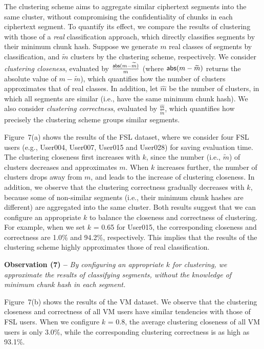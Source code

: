 \documentclass[bachelor]{thesis-uestc}
\begin{document}
The clustering scheme aims to aggregate similar ciphertext segments into the
same cluster, without compromising the confidentiality of chunks in each
ciphertext segment.  To quantify its effect, we compare the results of
clustering with those of a {\em real} classification approach, which directly
classifies segments by their minimum chunk hash.  Suppose we generate $m$ real
classes of segments by classification, and $\widetilde{m}$ clusters by the
clustering scheme, respectively.  We consider {\em clustering closeness},
evaluated by $\frac{{\sf abs}(m-\widetilde{m})}{m}$ (where 
${\sf abs}(m-\widetilde{m})$ returns the absolute value of $m-\widetilde{m}$),
which quantifies how the  number of clusters approximates that of real
classes. In addition, let $\hat{m}$ be the number of clusters, in which all
segments are similar (i.e., have the same minimum chunk hash). We also
consider {\em clustering correctness}, evaluated by
$\frac{\hat{m}}{\widetilde{m}}$, which quantifies how precisely the clustering
scheme groups similar segments.  

Figure~7(a) shows the results of the FSL dataset, where we
consider four FSL users (e.g., User004, User007, User015 and User028) for
saving evaluation time. The clustering closeness first increases with $k$,
since the number (i.e., $\widetilde{m}$) of clusters decreases and
approximates $m$. When $k$ increases further, the number of clusters drops
away from $m$, and leads to the increase of clustering closeness.  In
addition, we observe that the clustering correctness gradually decreases with
$k$, because some of non-similar segments (i.e., their minimum chunk hashes are
different) are aggregated into the same cluster. Both results suggest that we
can configure an appropriate $k$ to balance the closeness and correctness of
clustering. For example, when we set $k$ = 0.65 for User015, the corresponding
closeness and correctness are 1.0\% and 94.2\%, respectively. This implies
that the results of the clustering scheme  highly approximates
those of real classification.             

{\bf Observation (7) --} {\em By configuring an appropriate $k$ for
clustering, we  approximate the results of  classifying segments, without the knowledge of  minimum chunk hash in each
segment.}   

Figure~7(b) shows the results of the VM dataset. We observe
that the clustering closeness and correctness of all VM users have  similar
tendencies with those of FSL users. When we configure $k$ = 0.8, the average
clustering closeness of all VM users is only 3.0\%, while the corresponding
clustering correctness is as high as 93.1\%.     
\end{document}
